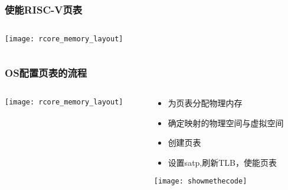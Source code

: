 \begin{frame} 
	\frametitle{使能RISC-V页表}
	
	\begin{columns}
		
		\begin{column}{1.\textwidth}
			\centering
			\texttt{[image: rcore\_memory\_layout]}
			
		\end{column}
		
		
		\begin{column}{.1\textwidth}
			
			
		\end{column}
		
		
	\end{columns}
\end{frame}


\begin{frame} 
	\frametitle{OS配置页表的流程}
	
	\begin{columns}
		
		\begin{column}{.4\textwidth}
			\texttt{[image: rcore\_memory\_layout]}
			
		\end{column}
		
		
		\begin{column}{.5\textwidth}
			
			\begin{itemize}
			\item 为页表分配物理内存 
			\item 确定映射的物理空间与虚拟空间
			\item 创建页表
			\item 设置satp,刷新TLB，使能页表 \pause
		
			\end{itemize}
			\texttt{[image: showmethecode]}
		\end{column}
		
		
	\end{columns}
\end{frame}


